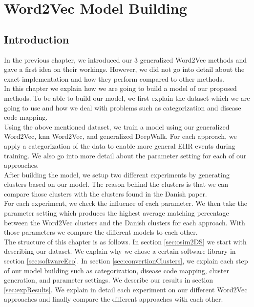 \graphicspath{ {Implementation/Images/} }


\chapter{Word2Vec Model Building}
\label{cha:implementation}

\section{Introduction}

In the previous chapter, we introduced our $3$ generalized Word2Vec methods and gave a first idea on their workings. However, we did not go into detail about the exact implementation and how they perform compared to other methods.  \\

In this chapter we explain how we are going to build a model of our proposed methods. To be able to build our model, we first explain the dataset which we are going to use and how we deal with problems such as categorization and disease code mapping. \\
Using the above mentioned dataset, we train a model using our generalized Word2Vec, knn Word2Vec, and generalized DeepWalk. For each approach, we apply a categorization of the data to enable more general EHR events during training. We also go into more detail about the parameter setting for each of our approaches. \\

After building the model, we setup two different experiments by generating clusters based on our model. The reason behind the clusters is that we can compare those clusters with the clusters found in the Danish paper. \\
For each experiment, we check the influence of each parameter. We then take the parameter setting which produces the highest average matching percentage between the Word2Vec clusters and the Danish clusters for each approach. With those parameters we compare the different models to each other. \\

The structure of this chapter is as follows. In section \ref{sec:osim2DS} we start with describing our dataset. We explain why we chose a certain software library in section \ref{sec:softwareEco}. In section \ref{sec:convertionClusters}, we explain each step of our model building such as categorization, disease code mapping, cluster generation, and parameter settings. We describe our results in section \ref{sec:expResults}. We explain in detail each experiment on our different Word2Vec approaches and finally compare the different approaches with each other.


